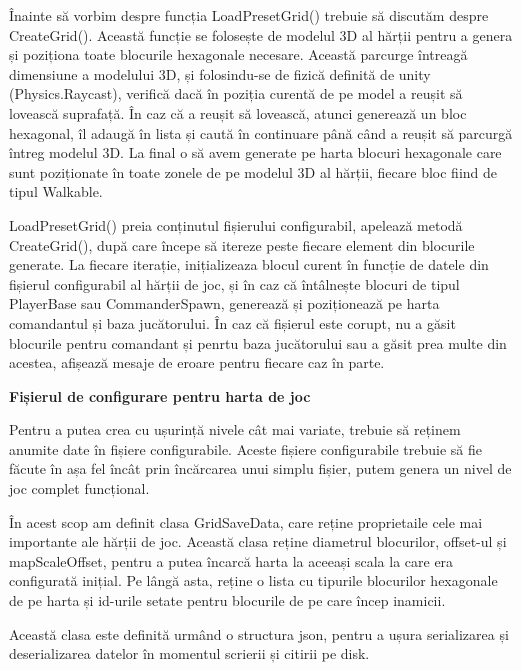 \documentclass[12pt, a4paper]{article}
\begin{document}
	Înainte să vorbim despre funcția LoadPresetGrid() trebuie să discutăm despre CreateGrid(). Această funcție se folosește de modelul 3D al hărții pentru a genera și poziționa toate blocurile hexagonale necesare. Această parcurge întreagă dimensiune a modelului 3D, și folosindu-se de fizică definită de unity (Physics.Raycast), verifică dacă în poziția curentă de pe model a reușit să lovească suprafață. În caz că a reușit să lovească, atunci generează un bloc hexagonal, îl adaugă în lista și caută în continuare până când a reușit să parcurgă întreg modelul 3D. La final o să avem generate pe harta blocuri hexagonale care sunt poziționate în toate zonele de pe modelul 3D al hărții, fiecare bloc fiind de tipul Walkable.
	\newline
	
	LoadPresetGrid() preia conținutul fișierului configurabil, apelează metodă CreateGrid(), după care începe să itereze peste fiecare element din blocurile generate. La fiecare iterație, inițializeaza blocul curent în funcție de datele din fișierul configurabil al hărții de joc, și în caz că întâlnește blocuri de tipul PlayerBase sau CommanderSpawn, generează și poziționează pe harta comandantul și baza jucătorului. În caz că fișierul este corupt, nu a găsit blocurile pentru comandant și penrtu baza jucătorului sau a găsit prea multe din acestea, afișează mesaje de eroare pentru fiecare caz în parte.
	\newline
	
	
	
	
	
	\textbf{Fișierul de configurare pentru harta de joc}
	
	Pentru a putea crea cu ușurință nivele cât mai variate, trebuie să reținem anumite date în fișiere configurabile. Aceste fișiere configurabile trebuie să fie făcute în așa fel încât prin încărcarea unui simplu fișier, putem genera un nivel de joc complet funcțional.
	\newline
	
	În acest scop am definit clasa GridSaveData, care reține proprietaile cele mai importante ale hărții de joc. Această clasa reține diametrul blocurilor, offset-ul și mapScaleOffset, pentru a putea încarcă harta la aceeași scala la care era configurată inițial. Pe lângă asta, reține o lista cu tipurile blocurilor hexagonale de pe harta și id-urile setate pentru blocurile de pe care încep inamicii.
	\newline
	
	Această clasa este definită urmând o structura json, pentru a ușura serializarea și deserializarea datelor în momentul scrierii și citirii pe disk.
	\newline
	
\end{document}
